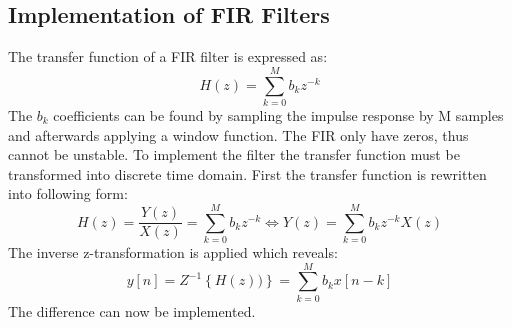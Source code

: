 \subsection*{Implementation of FIR Filters}

The transfer function of a FIR filter is expressed as:
\begin{equation}
H(z) = \sum_{k=0}^{M} b_k z^{-k}
\end{equation}
The $b_k$ coefficients can be found by sampling the impulse response by M samples and afterwards applying a window function. The FIR only have zeros, thus cannot be unstable. To implement the filter the transfer function must be transformed into discrete time domain. First the transfer function is rewritten into following form:
\begin{equation}
H(z) = \frac{Y(z)}{X(z)} = \sum_{k=0}^{M} b_k z^{-k} \Leftrightarrow Y(z) = \sum_{k=0}^{M} b_k z^{-k} X(z) 
\end{equation}
The inverse z-transformation is applied which reveals:
\begin{equation}
y[n] = Z^{-1} \left\lbrace H(z)) \right\rbrace =\sum_{k=0}^{M} b_k x[n-k]
\end{equation}
The difference can now be implemented.



